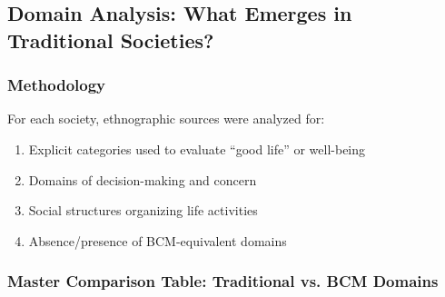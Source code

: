 \subsection{Domain Analysis: What Emerges in Traditional Societies?}

\subsubsection{Methodology}

For each society, ethnographic sources were analyzed for:
\begin{enumerate}[nosep]
\item Explicit categories used to evaluate ``good life'' or well-being
\item Domains of decision-making and concern
\item Social structures organizing life activities
\item Absence/presence of BCM-equivalent domains
\end{enumerate}

\subsubsection{Master Comparison Table: Traditional vs. BCM Domains}

